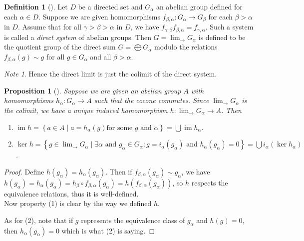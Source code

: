 \documentclass[reqno]{amsart}
\newtheorem{proposition}[theorem]{Proposition}
\theoremstyle{definition}
\newtheorem{definition}[theorem]{Definition}
\theoremstyle{remark}
\newtheorem*{note}{Note}
\DeclareMathOperator{\im}{im}
\begin{document}
\begin{definition}[]
    Let $D$ be a directed set and $G_{\alpha}$ an abelian group
    defined for each $\alpha \in D$. Suppose
    we are given homomorphisms
    $f_{\beta, \alpha} \colon G_{\alpha} \to G_{\beta}$ 
    for each $\beta > \alpha$ in $D$. Assume that for all
    $\gamma > \beta > \alpha$ in $D$, we have
    $f_{\gamma, \beta} f_{\beta, \alpha} = f_{\gamma, \alpha}$.
    Such a system is called a \textit{direct system} of abelian
    groups. Then $G = \lim_{\rightarrow} G_{\alpha}$ is defined
    to be the quotient group of the direct sum
    $G = \bigoplus G_{\alpha}$ modulo the relations
    $f_{\beta, \alpha}(g) \sim g$ for all $g \in G_\alpha$ and
    all $\beta > \alpha$.

    \begin{note}
        Hence the direct limit is just the colimit of the direct
        system.
    \end{note}
\end{definition}

\begin{proposition}[]\label{Prop:OXKXKCL}
    Suppose we are given an abelian group
    $A$ with homomorphisms
    $h_{\alpha} \colon G_{\alpha} \to A$ 
    such that the cocone commutes.
    Since $\lim_{\rightarrow} G_{\alpha}$ is the colimit, we
    have a unique induced homomorphism
    $h \colon \lim_{\rightarrow} G_{\alpha} \to A$.
    Then
    \begin{enumerate}
        \item $\im h = 
            \left\{ a \in A \mid a = h_{\alpha}(g) \text{
            for some } g \text{ and } \alpha \right\} 
            = \bigcup \im h_{\alpha} $.
        \item $\ker h = 
            \left\{ g \in \lim_{\rightarrow} G_{\alpha}  \mid 
            \exists \alpha \text{ and } 
        g_{\alpha} \in G_{\alpha} \colon g = 
    i_{\alpha}(g_{\alpha}) \text{ and }
h_{\alpha}(g_{\alpha}) = 0\right\} = 
\bigcup i_{\alpha}(\ker h_{\alpha}) $.
    \end{enumerate}
\end{proposition}

\begin{proof}
    Define $h (g_{\alpha}) = 
    h_{\alpha}(g_{\alpha})$. Then if
    $f_{\beta,\alpha}(g_{\alpha}) \sim g_{\alpha}$, we have
    $h\left( g_{\alpha} \right) 
    = h_{\alpha}\left( g_{\alpha} \right) 
    = h_{\beta} \circ f_{\beta,\alpha}(g_{\alpha})
    = h \left( f_{\beta,\alpha}(g_{\alpha}) \right) $, so
    $h$ respects the equivalence relations, thus it
    is well-defined.\\
    Now property (1) is clear by the way we defined $h$.

    As for (2), note that 
    if $g$ represents the equivalence class
    of $g_{\alpha}$ and
    $h(g) = 0$, then
    $h_{\alpha}\left( g_{\alpha} \right) = 0$ which
    is what (2) is saying.
\end{proof}
\end{document}
